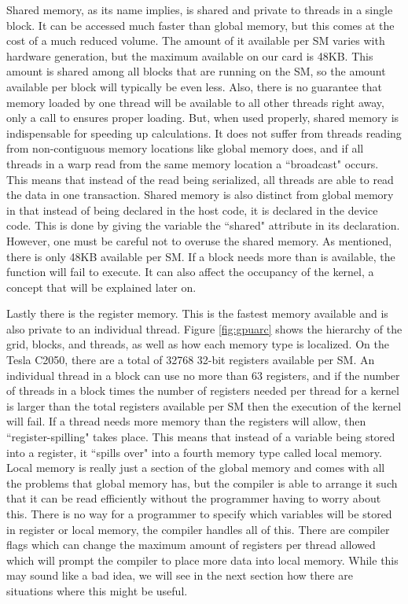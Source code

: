 Shared memory, as its name implies, is shared and private to threads in a single block. It can be accessed much faster than global memory, but this comes at the cost of a much reduced volume. The amount of it available per SM varies with hardware generation, but the maximum available on our card is 48KB. This amount is shared among all blocks that are running on the SM, so the amount available per block will typically be even less. Also, there is no guarantee that memory loaded by one thread will be available to all other threads right away, only a call to  ensures proper loading. But, when used properly, shared memory is indispensable for speeding up calculations. It does not suffer from threads reading from non-contiguous memory locations like global memory does, and if all threads in a warp read from the same memory location a ``broadcast" occurs. This means that instead of the read being serialized, all threads are able to read the data in one transaction. Shared memory is also distinct from global memory in that instead of being declared in the host code, it is declared in the device code. This is done by giving the variable the ``shared" attribute in its declaration. However, one must be careful not to overuse the shared memory. As mentioned, there is only 48KB available per SM. If a block needs more than is available, the function will fail to execute. It can also affect the occupancy of the kernel, a concept that will be explained later on.

Lastly there is the register memory. This is the fastest memory available and is also private to an individual thread. Figure \ref{fig:gpuarc} shows the hierarchy of the grid, blocks, and threads, as well as how each memory type is localized. On the Tesla C2050, there are a total of 32768 32-bit registers available per SM. An individual thread in a block can use no more than 63 registers, and if the number of threads in a block times the number of registers needed per thread for a kernel is larger than the total registers available per SM then the execution of the kernel will fail. If a thread needs more memory than the registers will allow, then ``register-spilling" takes place. This means that instead of a variable being stored into a register, it ``spills over" into a fourth memory type called local memory. Local memory is really just a section of the global memory and comes with all the problems that global memory has, but the compiler is able to arrange it such that it can be read efficiently without the programmer having to worry about this. There is no way for a programmer to specify which variables will be stored in register or local memory, the compiler handles all of this. There are compiler flags which can change the maximum amount of registers per thread allowed which will prompt the compiler to place more data into local memory. While this may sound like a bad idea, we will see in the next section how there are situations where this might be useful.

